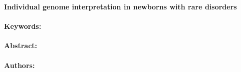 \noindent
\large {\bf Individual genome interpretation in newborns with rare disorders} 


\normalsize 


\noindent \paragraph{Keywords:} 

\noindent \paragraph{Abstract:} 



\noindent \paragraph{Authors:} 

